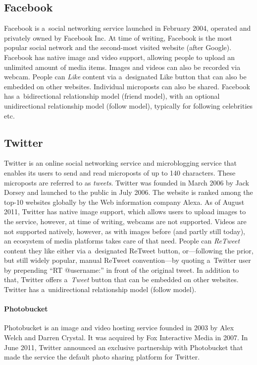 \subsection{Facebook}
Facebook is a~social networking service launched in February 2004,
operated and privately owned by Facebook Inc.
At time of writing, Facebook is the most popular social network
and the second-most visited website (after Google).
Facebook has native image and video support,
allowing people to upload an unlimited amount of media items.
Images and videos can also be recorded via webcam.
People can \emph{Like} content via a~designated Like button
that can also be embedded on other websites.
Individual microposts can also be shared.
Facebook has a~bidirectional relationship model (friend model),
with an optional unidirectional relationship model (follow model),
typically for following celebrities etc.

\subsection{Twitter}
Twitter is an online social networking service and microblogging service
that enables its users to send and read microposts of up to 140 characters.
These microposts are referred to as \emph{tweets}.
Twitter was founded in March 2006 by Jack Dorsey and launched to the public in July 2006.
The website is ranked among the top-10 websites globally by the Web information company Alexa.
As of August 2011, Twitter has native image support,
which allows users to upload images to the service, however, at time of writing,
webcams are not supported.
Videos are not supported natively, however, as with images before (and partly still today),
an ecosystem of media platforms takes care of that need.
People can \emph{ReTweet} content they like either via a~designated ReTweet button,
or---following the prior, but still widely popular, manual ReTweet convention---by
quoting a~Twitter user by prepending ``RT @username:'' in front of the original tweet.
In addition to that, Twitter offers a~\emph{Tweet} button that can be embedded on other websites.
Twitter has a~unidirectional relationship model (follow model).

\paragraph{Photobucket}
Photobucket is an image and video hosting service
founded in 2003 by Alex Welch and Darren Crystal.
It was acquired by Fox Interactive Media in 2007.
In June 2011, Twitter announced an exclusive partnership with Photobucket
that made the service the default photo sharing platform for Twitter.

